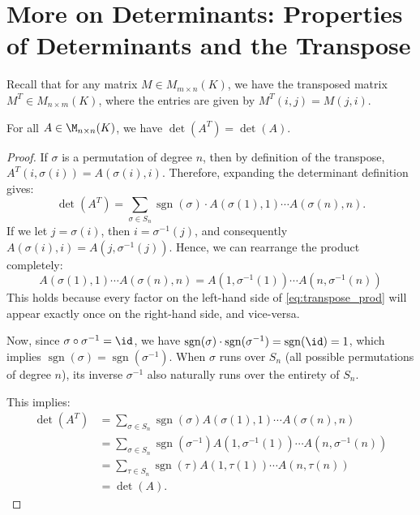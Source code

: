 \section{More on Determinants: Properties of Determinants and the Transpose}

Recall that for any matrix $M \in M_{m \times n}(K)$, we have the transposed matrix $M^T \in M_{n \times m}(K)$, where the entries are given by $M^T(i,j) = M(j,i)$.

\begin{theorem}
  \label{thm:det_transpose}
  For all $A \in \M_{n \times n}(K)$, we have $\det(A^T) = \det(A)$.
\end{theorem}

\begin{proof}
  If $\sigma$ is a permutation of degree $n$, then by definition of the transpose, $A^T(i, \sigma(i)) = A(\sigma(i), i)$.
  Therefore, expanding the determinant definition gives:
  \[
  \det(A^T) = \sum_{\sigma \in S_n} \operatorname{sgn}(\sigma) \cdot A(\sigma(1), 1) \cdots A(\sigma(n), n).
  \]
  If we let $j = \sigma(i)$, then $i = \sigma^{-1}(j)$, and consequently $A(\sigma(i), i) = A(j, \sigma^{-1}(j))$. Hence, we can rearrange the product completely:
  \begin{equation} \label{eq:transpose_prod}
    A(\sigma(1), 1) \cdots A(\sigma(n), n) = A(1, \sigma^{-1}(1)) \cdots A(n, \sigma^{-1}(n))
  \end{equation}
  This holds because every factor on the left-hand side of \eqref{eq:transpose_prod} will appear exactly once on the right-hand side, and vice-versa.

  Now, since $\sigma \circ \sigma^{-1} = \id$, we have $\operatorname{sgn}(\sigma) \cdot \operatorname{sgn}(\sigma^{-1}) = \operatorname{sgn}(\id) = 1$, which implies $\operatorname{sgn}(\sigma) = \operatorname{sgn}(\sigma^{-1})$.
  When $\sigma$ runs over $S_n$ (all possible permutations of degree $n$), its inverse $\sigma^{-1}$ also naturally runs over the entirety of $S_n$.

  This implies:
  \begin{align*}
    \det(A^T) &= \sum_{\sigma \in S_n} \operatorname{sgn}(\sigma) A(\sigma(1), 1) \cdots A(\sigma(n), n) \\
    &= \sum_{\sigma \in S_n} \operatorname{sgn}(\sigma^{-1}) A(1, \sigma^{-1}(1)) \cdots A(n, \sigma^{-1}(n)) \\
    &= \sum_{\tau \in S_n} \operatorname{sgn}(\tau) A(1, \tau(1)) \cdots A(n, \tau(n)) \\
    &= \det(A).
  \end{align*}
\end{proof}

